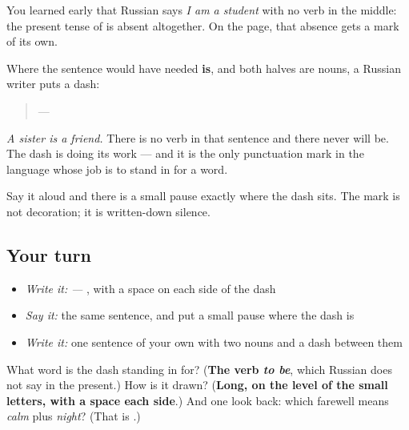 \begin{grammarlens}[title={Grammar lens — the mark for a verb that is not there}]
You learned early that Russian says \emph{I am a student} with no verb in the middle: the present tense of \textbf{} is absent altogether. On the page, that absence gets a mark of its own.

Where the sentence would have needed \textbf{is}, and both halves are nouns, a Russian writer puts a dash:

\begin{quote}
 — 
\end{quote}

\emph{A sister is a friend.} There is no verb in that sentence and there never will be. The dash is doing its work — and it is the only punctuation mark in the language whose job is to stand in for a word.

Say it aloud and there is a small pause exactly where the dash sits. The mark is not decoration; it is written-down silence.
\end{grammarlens}

\subsection*{Your turn}
\begin{itemize}
\raggedright
  \item \emph{Write it:} \emph{ — }, with a space on each side of the dash
  \item \emph{Say it:} the same sentence, and put a small pause where the dash is
  \item \emph{Write it:} one sentence of your own with two nouns and a dash between them
\end{itemize}

\begin{tcolorbox}[breakable,colback=teal!4,colframe=teal!35!black,title={Before you move on}]
What word is the dash standing in for? (\textbf{The verb \emph{to be}}, which Russian does not say in the present.) How is it drawn? (\textbf{Long, on the level of the small letters, with a space each side}.) And one look back: which farewell means \emph{calm} plus \emph{night}? (That is \textbf{ }.)
\end{tcolorbox}
